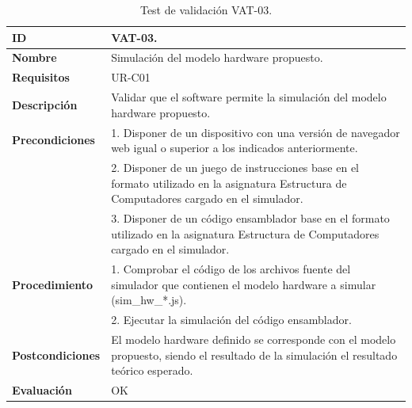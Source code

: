 \begin{center}
\begin{table}[htb]
\centering
\caption{Test de validación VAT-03.}
\begin{tabular}{@{}p{2.5cm} p{9cm}@{}} 
\toprule
\textbf{ID} 					& VAT-03. \\
\midrule
\textbf{Nombre} 				& Simulación del modelo \gls{hardware} propuesto. \\
\midrule
\textbf{Requisitos} 		& UR-C01 \\
\midrule
\textbf{Descripción} 		& Validar que el \gls{software} permite la simulación del modelo \gls{hardware} propuesto. \\
\midrule
\textbf{Precondiciones}		& 1. Disponer de un dispositivo con una versión de navegador web igual o superior a los indicados anteriormente. \\
											& 2. Disponer de un juego de instrucciones base en el formato utilizado en la asignatura Estructura de Computadores cargado en el simulador. \\
											& 3. Disponer de un código \gls{ensamblador} base en el formato utilizado en la asignatura Estructura de Computadores cargado en el simulador. \\
\midrule
\textbf{Procedimiento}		& 1. Comprobar el código de los archivos fuente del simulador que contienen el modelo \gls{hardware} a simular (sim\_hw\_*.js).\\
											& 2. Ejecutar la simulación del código \gls{ensamblador}.\\
\midrule
\textbf{Postcondiciones} 		&  El modelo \gls{hardware} definido se corresponde con el modelo propuesto, siendo el resultado de la simulación el resultado teórico esperado.\\
\midrule
\textbf{Evaluación} 			& OK \\
\bottomrule
\end{tabular}
\label{tab:vat-03}
\end{table}
\end{center}

